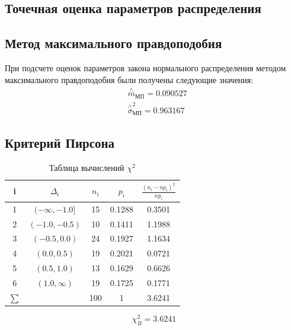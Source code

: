 \documentclass[a4]{article}
\begin{document}
\subsection{Точечная оценка параметров распределения}
\subsection{Метод максимального правдоподобия}

При подсчете оценок параметров закона нормального распределения методом максимального правдоподобия были получены следующие значения:
\begin{equation}
\begin{split}
&\overset{\wedge}{m}_{\text{МП}} = 0.090527\\
&  \overset{\wedge}{\sigma}^2_{\text{МП}} = 0.963167
\end{split}
\end{equation}
\subsection{Критерий Пирсона}
\begin{table}[H]
	\caption{Таблица вычислений $\chi^2$}
	\label{tab:my_label1}
	\begin{center}
		\vspace{5mm}
		\begin{tabular}{|c|c|c|c|c|}
			\hline
			i & $\Delta_i$ & $n_i$ & $p_i$ & $\frac{(n_i-np_i)^2}{np_i}$\\
			\hline
			1&	 $(-\infty, -1.0]$ &	15  &	 0.1288 &	 0.3501\\
			\hline
			2&	$(-1.0, -0.5)$&	10&	 0.1411&	  1.1988\\
			\hline
			3& $(-0.5, 0.0)$&	24&	 0.1927&	 1.1634\\
			\hline
			4&	$(0.0, 0.5)$&	19&	 0.2021&	 0.0721\\
			\hline
			5& $(0.5, 1.0)$&	13&	 0.1629&	 0.6626\\
			\hline
			6& $(1.0, \infty)$&	19&	 0.1725&	 0.1771\\
			\hline
			$\sum$&&		100&	1  & 3.6241	\\
			
			\hline
		\end{tabular}
	\end{center}
\end{table}

$$\chi_B^2= 3.6241$$
\end{document}

